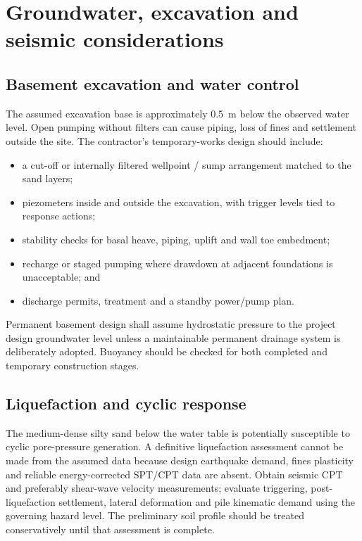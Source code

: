 \section{Groundwater, excavation and seismic considerations}
\subsection{Basement excavation and water control}
The assumed excavation base is approximately \SI{0.5}{\metre} below the observed water level.
Open pumping without filters can cause piping, loss of fines and settlement outside the site.
The contractor's temporary-works design should include:
\begin{itemize}
  \item a cut-off or internally filtered wellpoint / sump arrangement matched to the sand layers;
  \item piezometers inside and outside the excavation, with trigger levels tied to response actions;
  \item stability checks for basal heave, piping, uplift and wall toe embedment;
  \item recharge or staged pumping where drawdown at adjacent foundations is unacceptable; and
  \item discharge permits, treatment and a standby power/pump plan.
\end{itemize}

Permanent basement design shall assume hydrostatic pressure to the project design groundwater
level unless a maintainable permanent drainage system is deliberately adopted. Buoyancy should
be checked for both completed and temporary construction stages.

\subsection{Liquefaction and cyclic response}
The medium-dense silty sand below the water table is potentially susceptible to cyclic pore-pressure
generation. A definitive liquefaction assessment cannot be made from the assumed data because
design earthquake demand, fines plasticity and reliable energy-corrected SPT/CPT data are absent.
Obtain seismic CPT and preferably shear-wave velocity measurements; evaluate triggering,
post-liquefaction settlement, lateral deformation and pile kinematic demand using the governing
hazard level. The preliminary soil profile should be treated conservatively until that assessment
is complete.

